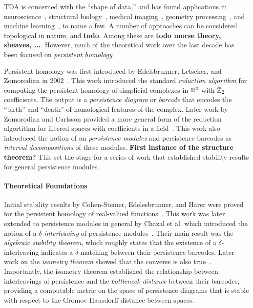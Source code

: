 
TDA is concerned with the ``shape of data,'' and has found applications in
neuroscience~\cite{saggar2018towards, sizemore2019importance},
structural biology~\cite{gameiro2015topological,kovacev2016using,dey2018protein},
medical imaging~\cite{carlsson2008local,robins2011theory,bendich2016persistent},
geometry processing~\cite{skraba2010persistence,poulenard2018topological,bruel2020topology},
and machine learning~\cite{clough2019explicit,chen2019topological,carlsson2020topological,gabrielsson2020topology}, to name a few.
A number of approaches can be considered topological in nature, and \textbf{todo}.
Among these are \textbf{todo morse theory, sheaves, ...}.
However, much of the theoretical work over the last decade has been focused on \emph{persistent homology}.

Persistent homology was first introduced by Edelsbrunner, Letscher, and Zomorodian in 2002~\cite{edelsbrunner02simplification}.
This work introduced the standard \emph{reduction algorithm} for computing the persistent homology of simplicial complexes in $\mathbb{R}^3$ with $\mathbb{Z}_2$ coefficients.
The output is a \emph{persistence diagram} or \emph{barcode} that encodes the ``birth'' and ``death'' of homological features of the complex.
Later work by Zomorodian and Carlsson provided a more general form of the reduction algortithm for filtered spaces with coefficients in a field~\cite{zomorodian05computing}.
This work also introduced the notion of an \emph{persistence modules} and persistence barcodes as \emph{interval decompositions} of these modules.
\textbf{First instance of the structure theorem?}
This set the stage for a series of work that established stability results for general persistence modules.

\paragraph{Theoretical Foundations}

Initial stability results by Cohen-Steiner, Edelesbrunner, and Harer were proved for the persistent homology of real-valued functions~\cite{cohensteiner07stability}.
This work was later extended to persistence modules in general by Chazal et al. which introduced the notion of a \emph{$\delta$-interleaving} of persistence modules~\cite{chazal09proximity}.
Their main result was the \emph{algebraic stability theorem}, which roughly states that the existence of a $\delta$-interleaving indicates a $\delta$-matching between their persistence barcodes.
Later work on the \emph{isometry theorem} showed that the converse is also true~\cite{todo}.
Importantly, the isometry theorem established the relationship between interleavings of persistence and the \emph{bottleneck distance} between their barcodes, providing a computable metric on the space of persistence diagrams that is stable with respect to the Gromov-Hausdorff distance between spaces.

